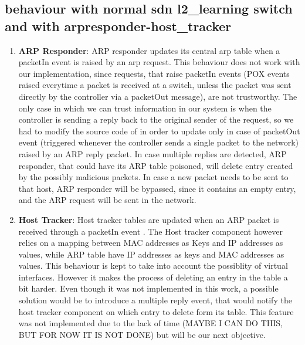 \documentclass[11pt]{article}
\newcommand*{\code}{\fontfamily{lmtt}\selectfont}
\begin{document}
\subsection{behaviour with normal sdn l2\_learning switch and with arpresponder-host\_tracker}
\begin {enumerate}
\item \textbf{ARP Responder}: ARP responder updates its central arp table when a packetIn event is raised by an arp request. This behaviour does not work with our implementation, since requests, that raise packetIn events (POX events raised everytime a packet is received at a switch, unless the packet was sent directly by the controller via a packetOut message), are not trustworthy. The only case in which we can trust information in our system is when the controller is sending a reply back to the original sender of the request, so we had to modify the source code of {\code{arp\_responder.py}} in order to update only in case of packetOut event (triggered whenever the controller sends a single packet to the network) raised by an ARP reply packet.
In case multiple replies are detected, ARP responder, that could have its ARP table poisoned, will delete entry created by the possibly malicious packets. In case a new packet needs to be sent to that host, ARP responder will be bypassed, since it contains an empty entry, and the ARP request will be sent in the network.
\item \textbf{Host Tracker}: Host tracker tables are updated when an ARP packet is received through a packetIn event .
The Host tracker component however relies on a mapping between MAC addresses as Keys and IP addresses as values, while ARP table have IP addresses as keys and MAC addresses as values. This behaviour is kept to take into account the possiblity of virtual interfaces. However it makes the process of deleting an entry in the table a bit harder. Even though it was not implemented in this work, a possible solution would be to introduce a multiple reply event, that would notify the host tracker component on which entry to delete form its table. This feature was not implemented due to the lack of time (MAYBE I CAN DO THIS, BUT FOR NOW IT IS NOT DONE) but will be our next objective.

\end{enumerate}
\end{document}
